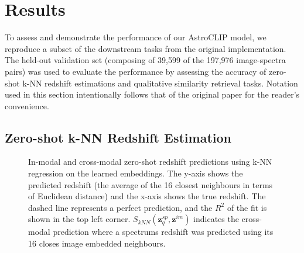 
\section{Results}\label{sec:results}
To assess and demonstrate the performance of our AstroCLIP model, we reproduce a subset of the downstream tasks from
the original implementation.
The held-out validation set (composing of 39,599 of the 197,976 image-spectra pairs) was used to evaluate the performance
by assessing the accuracy of zero-shot k-NN redshift estimations and qualitative similarity retrieval tasks.
Notation used in this section intentionally follows that of the original paper for the reader's convenience.

\subsection{Zero-shot k-NN Redshift Estimation}\label{subsec:results-redshift-regression}
\begin{figure}[htb]
    \centering
    \caption{In-modal and cross-modal zero-shot redshift predictions using k-NN regression on the learned embeddings. The y-axis shows
    the predicted redshift (the average of the 16 closest neighbours in terms of Euclidean distance) and the x-axis shows the true redshift.
    The dashed line represents a perfect prediction, and the $R^{2}$ of the fit is shown in the top left corner.
    $S_{kNN}(\mathbf{z}_{q}^{sp}, \mathbf{z}^{im})$ indicates the cross-modal prediction where a spectrums redshift was
    predicted using its 16 closes image embedded neighbours.}
    \label{fig:rkr}
\end{figure}

